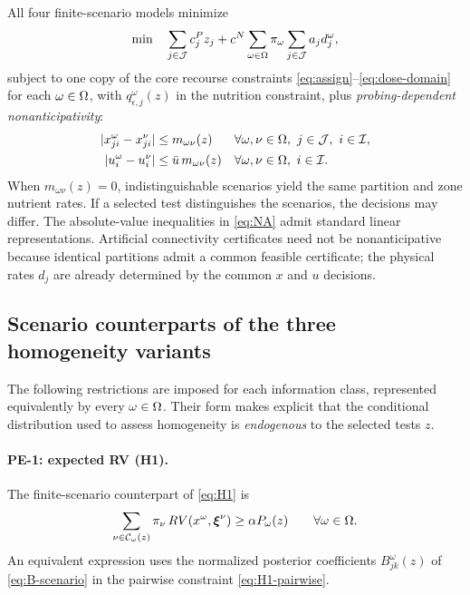 All four finite-scenario models minimize
\begin{equation}
 \min\quad
  \sum_{j\in\mathcal{J}}c_j^Pz_j
  +c^N\sum_{\omega\in\Omega}\pi_\omega
           \sum_{j\in\mathcal{J}}a_jd_j^\omega,
 \label{eq:scenario-objective}
\end{equation}
subject to one copy of the core recourse constraints
\eqref{eq:assign}--\eqref{eq:dose-domain} for each $\omega\in\Omega$,
with $q_{\epsilon,j}^\omega(z)$ in the nutrition constraint, plus
\emph{probing-dependent nonanticipativity}:
\begin{equation}
\begin{aligned}
 |x_{ji}^\omega-x_{ji}^\nu|
 &\leq m_{\omega\nu}(z)
 &&\forall\omega,\nu\in\Omega,\ j\in\mathcal{J},\ i\in\mathcal{I},\\
 |u_i^\omega-u_i^\nu|
 &\leq\bar u\,m_{\omega\nu}(z)
 &&\forall\omega,\nu\in\Omega,\ i\in\mathcal{I}.
\end{aligned}
\label{eq:NA}
\end{equation}
When $m_{\omega\nu}(z)=0$, indistinguishable scenarios yield
the same partition and zone nutrient rates. If a selected test
distinguishes the scenarios, the decisions may differ. The
absolute-value inequalities in \eqref{eq:NA} admit standard linear
representations. Artificial connectivity certificates need not be
nonanticipative because identical partitions admit a common feasible
certificate; the physical rates $d_j$ are already determined by the
common $x$ and $u$ decisions.

\subsection{Scenario counterparts of the three homogeneity variants}
\label{subsec:finite-homogeneity}

The following restrictions are imposed for each information class,
represented equivalently by every $\omega\in\Omega$. Their form makes
explicit that the conditional distribution used to assess homogeneity
is \emph{endogenous} to the selected tests $z$.

\paragraph{PE-1: expected RV (H1).}
The finite-scenario counterpart of \eqref{eq:H1} is
\begin{equation}
 \sum_{\nu\in\mathcal C_\omega(z)}
    \pi_\nu\,RV(x^\omega,\boldsymbol\xi^\nu)
 \geq\alpha P_\omega(z)
 \qquad\forall\omega\in\Omega.
 \label{eq:H1-scenario}
\end{equation}
An equivalent expression uses the normalized posterior coefficients
$B_{jk}^\omega(z)$ of \eqref{eq:B-scenario} in the pairwise constraint
\eqref{eq:H1-pairwise}.

